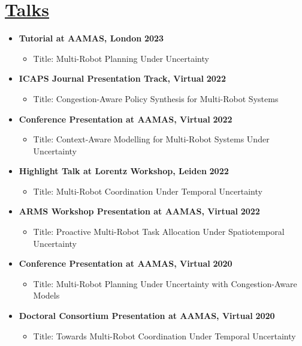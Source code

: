 \documentclass[11pt]{article}
\begin{document}
\section*{\underline{Talks}}
\begin{itemize}
\item \textbf{Tutorial at AAMAS, London} \hfill \textbf{2023}
\begin{itemize}
\item Title: Multi-Robot Planning Under Uncertainty
\end{itemize}
\item \textbf{ICAPS Journal Presentation Track, Virtual} \hfill \textbf{2022}
\begin{itemize}
\item Title: Congestion-Aware Policy Synthesis for Multi-Robot Systems
\end{itemize}
\item \textbf{Conference Presentation at AAMAS, Virtual} \hfill \textbf{2022}
\begin{itemize}
\item Title: Context-Aware Modelling for Multi-Robot Systems Under Uncertainty
\end{itemize}
\item \textbf{Highlight Talk at Lorentz Workshop, Leiden} \hfill \textbf{2022}
\begin{itemize}
\item Title: Multi-Robot Coordination Under Temporal Uncertainty
\end{itemize}
\item \textbf{ARMS Workshop Presentation at AAMAS, Virtual} \hfill \textbf{2022}
\begin{itemize}
\item Title: Proactive Multi-Robot Task Allocation Under Spatiotemporal Uncertainty
\end{itemize}
\item \textbf{Conference Presentation at AAMAS, Virtual} \hfill \textbf{2020}
\begin{itemize}
\item Title: Multi-Robot Planning Under Uncertainty with Congestion-Aware Models
\end{itemize}
\item \textbf{Doctoral Consortium Presentation at AAMAS, Virtual} \hfill \textbf{2020}
\begin{itemize}
\item Title: Towards Multi-Robot Coordination Under Temporal Uncertainty
\end{itemize}
\end{itemize}
\fi
\end{document}
